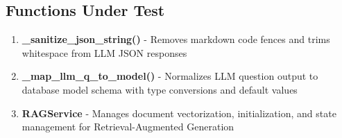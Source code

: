 \documentclass{article}
\begin{document}
\subsection*{Functions Under Test}

\begin{enumerate}
    \item \textbf{\_sanitize\_json\_string()} - Removes markdown code fences and trims whitespace from LLM JSON responses
    \item \textbf{\_map\_llm\_q\_to\_model()} - Normalizes LLM question output to database model schema with type conversions and default values
    \item \textbf{RAGService} - Manages document vectorization, initialization, and state management for Retrieval-Augmented Generation
\end{enumerate}
\end{document}

